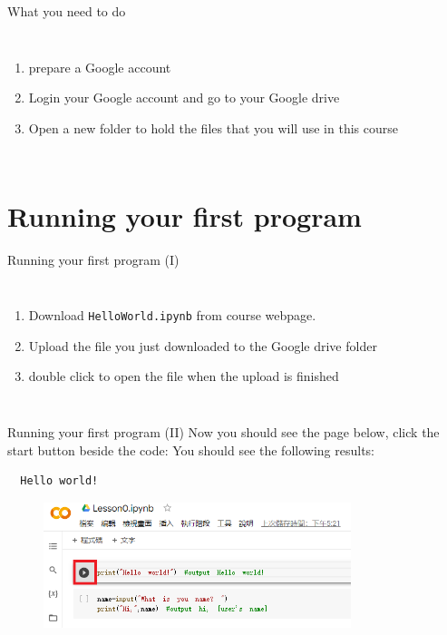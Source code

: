 \documentclass[10pt,xcolor={table,dvipsnames},t]{beamer}
\begin{document}
\begin{frame}[fragile]{What you need to do}
  \begin{columns}
    \begin{enumerate}[Step 1:]
      \item prepare a Google account
      \item Login your Google account and go to your Google drive
      \item Open a new folder to hold the files that you will use in this course
    \end{enumerate}
  \end{columns}
\end{frame}


\section{Running your first program}
\begin{frame}{Running your first program (I)}
  \begin{columns}
    \begin{enumerate}[Step 1:]
      \item Download \texttt{HelloWorld.ipynb} from course webpage.
      \item Upload the file you just downloaded to the Google drive folder
      \item double click to open the file when the upload is finished
    \end{enumerate}
  \end{columns}
\end{frame}

\begin{frame}[fragile]{Running your first program (II)}
  Now you should see the page below, click the start button beside the code:
\vspace{1mm}
You should see the following results:
\begin{lstlisting}
  Hello world!
\end{lstlisting}
\begin{figure}
  \includegraphics[width=0.8\textwidth]{img/driveAddCollab.png}
\end{figure}
\end{frame}
\end{document}
